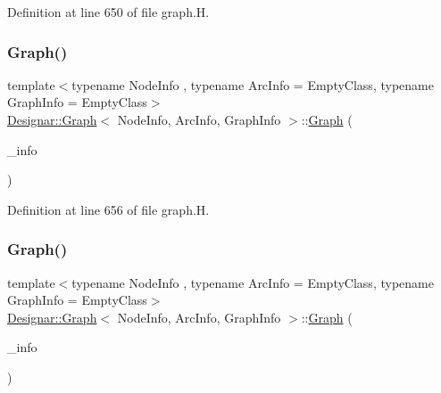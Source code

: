 Definition at line 650 of file graph.\+H.

\mbox{\label{class_designar_1_1_graph_a61f5be7345295aa375f3a329ded36c17}} 
\subsubsection{\texorpdfstring{Graph()}{Graph()}\hspace{0.1cm}{\footnotesize\ttfamily [2/5]}}
{\footnotesize\ttfamily template$<$typename Node\+Info , typename Arc\+Info  = Empty\+Class, typename Graph\+Info  = Empty\+Class$>$ \\
\hyperlink{class_designar_1_1_graph}{Designar\+::\+Graph}$<$ Node\+Info, Arc\+Info, Graph\+Info $>$\+::\hyperlink{class_designar_1_1_graph}{Graph} (\begin{DoxyParamCaption}\item[{const Graph\+Info \&}]{\+\_\+info }\end{DoxyParamCaption})\hspace{0.3cm}{\ttfamily [inline]}}



Definition at line 656 of file graph.\+H.

\mbox{\label{class_designar_1_1_graph_a14f42f1511cc6e9edf7f54f656febf1e}} 
\subsubsection{\texorpdfstring{Graph()}{Graph()}\hspace{0.1cm}{\footnotesize\ttfamily [3/5]}}
{\footnotesize\ttfamily template$<$typename Node\+Info , typename Arc\+Info  = Empty\+Class, typename Graph\+Info  = Empty\+Class$>$ \\
\hyperlink{class_designar_1_1_graph}{Designar\+::\+Graph}$<$ Node\+Info, Arc\+Info, Graph\+Info $>$\+::\hyperlink{class_designar_1_1_graph}{Graph} (\begin{DoxyParamCaption}\item[{Graph\+Info \&\&}]{\+\_\+info }\end{DoxyParamCaption})\hspace{0.3cm}{\ttfamily [inline]}}



